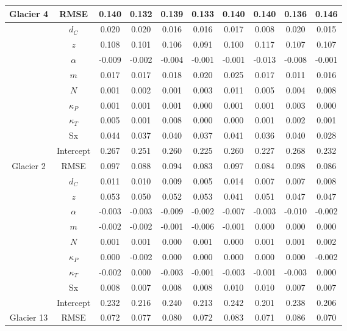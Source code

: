 \documentclass[12pt]{article}
\begin{document}
\begin{landscape}
\begin{table}
\begin{tabular}{cccccccccc}
\multirow{-10}{*}{Glacier 4} & RMSE & 0.140 & 0.132 & 0.139 & 0.133 & 0.140 & 0.140 & 0.136 & 0.146 \\ \hline
 & $d_C$ & 0.020 & 0.020 & 0.016 & 0.016 & 0.017 & 0.008 & 0.020 & 0.015 \\
 & $z$ & 0.108 & 0.101 & 0.106 & 0.091 & 0.100 & 0.117 & 0.107 & 0.107 \\
 & $\alpha$ & -0.009 & -0.002 & -0.004 & -0.001 & -0.001 & -0.013 & -0.008 & -0.001 \\
 & $m$ & 0.017 & 0.017 & 0.018 & 0.020 & 0.025 & 0.017 & 0.011 & 0.016 \\
 & $N$ & 0.001 & 0.002 & 0.001 & 0.003 & 0.011 & 0.005 & 0.004 & 0.008 \\
 & $\kappa_P$ & 0.001 & 0.001 & 0.001 & 0.000 & 0.001 & 0.001 & 0.003 & 0.000 \\
 & $\kappa_T$ & 0.005 & 0.001 & 0.008 & 0.000 & 0.000 & 0.001 & 0.002 & 0.001 \\
 & Sx & 0.044 & 0.037 & 0.040 & 0.037 & 0.041 & 0.036 & 0.040 & 0.028 \\
 & Intercept & 0.267 & 0.251 & 0.260 & 0.225 & 0.260 & 0.227 & 0.268 & 0.232 \\
\multirow{-10}{*}{Glacier 2} & RMSE & 0.097 & 0.088 & 0.094 & 0.083 & 0.097 & 0.084 & 0.098 & 0.086 \\ \hline
 
 & $d_C$ & 0.011 & 0.010 & 0.009 & 0.005 & 0.014 & 0.007 & 0.007 & 0.008 \\
 
 & $z$ & 0.053 & 0.050 & 0.052 & 0.053 & 0.041 & 0.051 & 0.047 & 0.047 \\
 
 & $\alpha$ & -0.003 & -0.003 & -0.009 & -0.002 & -0.007 & -0.003 & -0.010 & -0.002 \\
 
 & $m$ & -0.002 & -0.002 & -0.001 & -0.006 & -0.001 & 0.000 & 0.000 & 0.000 \\
 
 & $N$ & 0.001 & 0.001 & 0.000 & 0.001 & 0.000 & 0.001 & 0.001 & 0.002 \\
 
 & $\kappa_P$ & 0.000 & -0.002 & 0.000 & 0.000 & 0.000 & 0.000 & 0.000 & -0.002 \\
 
 & $\kappa_T$ & -0.002 & 0.000 & -0.003 & -0.001 & -0.003 & -0.001 & -0.003 & 0.000 \\
 
 & Sx & 0.008 & 0.007 & 0.008 & 0.008 & 0.010 & 0.010 & 0.007 & 0.007 \\
 
 & Intercept & 0.232 & 0.216 & 0.240 & 0.213 & 0.242 & 0.201 & 0.238 & 0.206 \\
 
\multirow{-10}{*}{Glacier 13} & RMSE & 0.072 & 0.077 & 0.080 & 0.072 & 0.083 & 0.071 & 0.086 & 0.070
\end{tabular}
\end{table}
\end{landscape}
\end{document}

